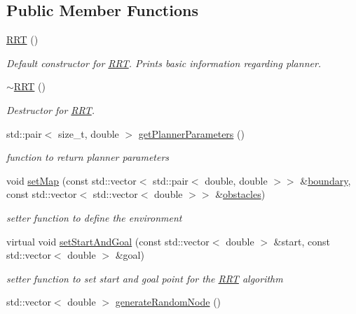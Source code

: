 \subsection*{Public Member Functions}
\begin{DoxyCompactItemize}
\item 
\hyperlink{classRRT_a0a7bb3a3af2d70c656764fbe8f6ae671}{R\+RT} ()
\begin{DoxyCompactList}\small\item\em Default constructor for \hyperlink{classRRT}{R\+RT}. Prints basic information regarding planner. \end{DoxyCompactList}\item 
\hyperlink{classRRT_ab16d13c231d664dddaf41f904d5770f8}{$\sim$\+R\+RT} ()
\begin{DoxyCompactList}\small\item\em Destructor for \hyperlink{classRRT}{R\+RT}. \end{DoxyCompactList}\item 
std\+::pair$<$ size\+\_\+t, double $>$ \hyperlink{classRRT_af036e6c57778da5d017493ee1a2d0d37}{get\+Planner\+Parameters} ()
\begin{DoxyCompactList}\small\item\em function to return planner parameters \end{DoxyCompactList}\item 
void \hyperlink{classRRT_a99d47b882000b264f594b374b18c49c0}{set\+Map} (const std\+::vector$<$ std\+::pair$<$ double, double $>$$>$ \&\hyperlink{MapTest_8cpp_ad2559d9d65caf07bc831e905bc151444}{boundary}, const std\+::vector$<$ std\+::vector$<$ double $>$$>$ \&\hyperlink{MapTest_8cpp_ab66426f62219d5ce7554221a370691fe}{obstacles})
\begin{DoxyCompactList}\small\item\em setter function to define the environment \end{DoxyCompactList}\item 
virtual void \hyperlink{classRRT_a4954f750e5aedfea24fb52771bd5b1af}{set\+Start\+And\+Goal} (const std\+::vector$<$ double $>$ \&start, const std\+::vector$<$ double $>$ \&goal)
\begin{DoxyCompactList}\small\item\em setter function to set start and goal point for the \hyperlink{classRRT}{R\+RT} algorithm \end{DoxyCompactList}\item 
std\+::vector$<$ double $>$ \hyperlink{classRRT_ab85d824e85c9c0e7ed5ee385f5649993}{generate\+Random\+Node} ()

\end{DoxyCompactItemize}
